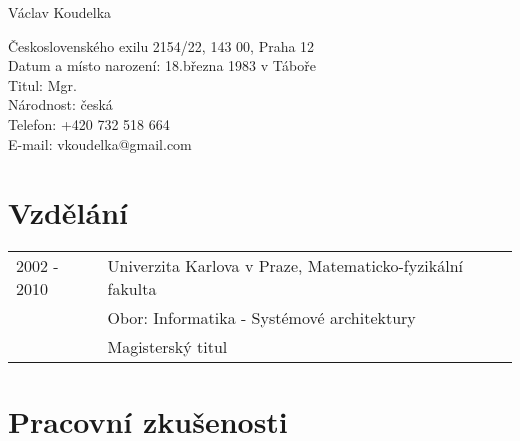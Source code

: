\documentclass[11pt,letterpaper]{article}
\def\name{Václav Koudelka}
\begin{document}
{\huge \name}


\vspace{0.25in}

\begin{minipage}[t]{0.8\textwidth} 
  Československého exilu 2154/22, 143 00, Praha 12\\
  Datum a místo narození: 18.března 1983 v Táboře \\
  Titul: Mgr. \\
  Národnost: česká \\
  Telefon: +420 732 518 664 \\
  E-mail: vkoudelka@gmail.com \\
\end{minipage}

\section*{Vzdělání}

\begin{tabular}{lll}
2002 - 2010 & Univerzita Karlova v Praze, Matematicko-fyzikální fakulta \\
      & Obor: Informatika - Systémové architektury \\
      & Magisterský titul      
\end{tabular}

\section*{Pracovní zkušenosti}
\end{document}
